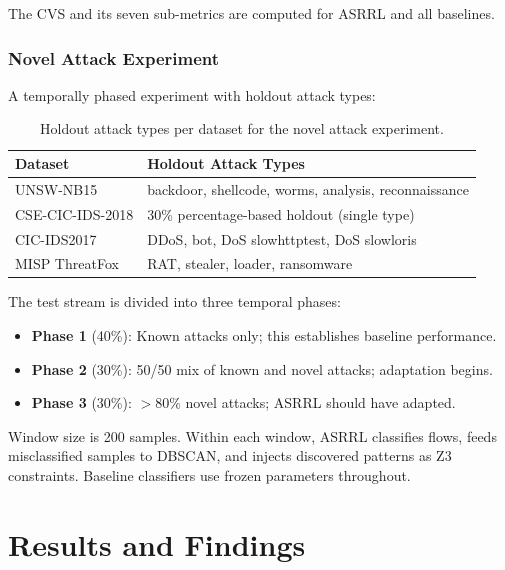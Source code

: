 \documentclass[12pt, letterpaper, oneside]{report}
\newcommand{\ASRRL}{\textsc{ASRRL}}
\begin{document}
The CVS and its seven sub-metrics are computed for \ASRRL{} and all baselines.

\subsection{Novel Attack Experiment}

A temporally phased experiment with holdout attack types:

\begin{table}[htbp]
\centering
\caption{Holdout attack types per dataset for the novel attack experiment.}
\label{tab:holdout}
\small
\begin{tabular}{ll}
\toprule
\textbf{Dataset} & \textbf{Holdout Attack Types} \\
\midrule
UNSW-NB15 & backdoor, shellcode, worms, analysis, reconnaissance \\
CSE-CIC-IDS-2018 & 30\% percentage-based holdout (single type) \\
CIC-IDS2017 & DDoS, bot, DoS slowhttptest, DoS slowloris \\
MISP ThreatFox & RAT, stealer, loader, ransomware \\
\bottomrule
\end{tabular}
\end{table}

\noindent The test stream is divided into three temporal phases:
\begin{itemize}
    \item \textbf{Phase 1} (40\%): Known attacks only; this establishes baseline performance.
    \item \textbf{Phase 2} (30\%): 50/50 mix of known and novel attacks; adaptation begins.
    \item \textbf{Phase 3} (30\%): $>$80\% novel attacks; \ASRRL{} should have adapted.
\end{itemize}

Window size is 200 samples. Within each window, \ASRRL{} classifies flows, feeds misclassified samples to DBSCAN, and injects discovered patterns as Z3 constraints. Baseline classifiers use frozen parameters throughout.



\chapter{Results and Findings}
\label{ch:findings}
\end{document}
